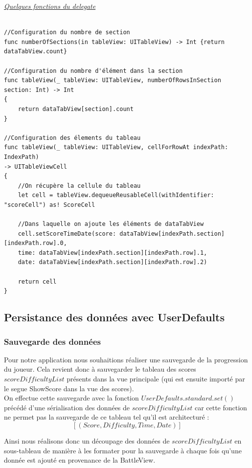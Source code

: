 \documentclass{article}
\begin{document}
\noindent \underline{\textit{Quelques fonctions du delegate}}
\begin{verbatim}

//Configuration du nombre de section
func numberOfSections(in tableView: UITableView) -> Int {return dataTabView.count}

//Configuration du nombre d'élément dans la section
func tableView(_ tableView: UITableView, numberOfRowsInSection section: Int) -> Int 
{
    return dataTabView[section].count
}

//Configuration des élements du tableau
func tableView(_ tableView: UITableView, cellForRowAt indexPath: IndexPath) 
-> UITableViewCell
{
    //On récupère la cellule du tableau
    let cell = tableView.dequeueReusableCell(withIdentifier: "scoreCell") as! ScoreCell
    
    //Dans laquelle on ajoute les éléments de dataTabView
    cell.setScoreTimeDate(score: dataTabView[indexPath.section][indexPath.row].0, 
    time: dataTabView[indexPath.section][indexPath.row].1, 
    date: dataTabView[indexPath.section][indexPath.row].2)
    
    return cell
}
\end{verbatim}


\subsection{Persistance des données avec UserDefaults}


\subsubsection{Sauvegarde des données}

Pour notre application nous souhaitions réaliser une sauvegarde de la progression du joueur. Cela revient donc à sauvegarder le tableau des scores $scoreDifficultyList$ présents dans la vue principale (qui est ensuite importé par le segue ShowScore dans la vue des scores). \\

On effectue cette sauvegarde avec la fonction $UserDefaults.standard.set()$ précédé d'une sérialisation des données de $scoreDifficultyList$ car cette fonction ne permet pas la sauvegarde de ce tableau tel qu'il est architecturé :
$$[(Score,Difficulty,Time,Date)]$$

Ainsi nous réalisons donc un découpage des données de $scoreDifficultyList$ en sous-tableau de manière à les formater pour la sauvegarde à chaque fois qu'une donnée est ajouté en provenance de la BattleView.\\
\end{document}
